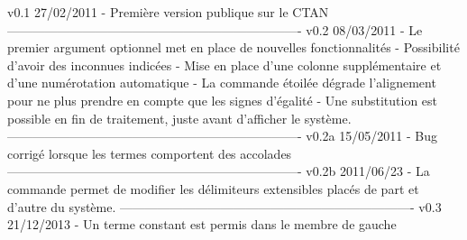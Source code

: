 v0.1        27/02/2011
	- Premi\`ere version publique sur le CTAN
----------------------------------------------------------------------
v0.2        08/03/2011
    - Le premier argument optionnel met en place de nouvelles
      fonctionnalit\'es
    - Possibilit\'e d'avoir des inconnues indic\'ees
    - Mise en place d'une colonne suppl\'ementaire et d'une
      num\'erotation automatique
    - La commande \'etoil\'ee \systeme* d\'egrade l'alignement pour ne
      plus prendre en compte que les signes d'\'egalit\'e
    - Une substitution est possible en fin de traitement, juste
      avant d'afficher le syst\`eme.
----------------------------------------------------------------------
v0.2a       15/05/2011
    - Bug corrig\'e lorsque les termes comportent des accolades
----------------------------------------------------------------------
v0.2b       2011/06/23
    - La commande \setdelim permet de modifier les d\'elimiteurs
      extensibles plac\'es de part et d'autre du syst\`eme.
----------------------------------------------------------------------
v0.3        21/12/2013
    - Un terme constant est permis dans le membre de gauche